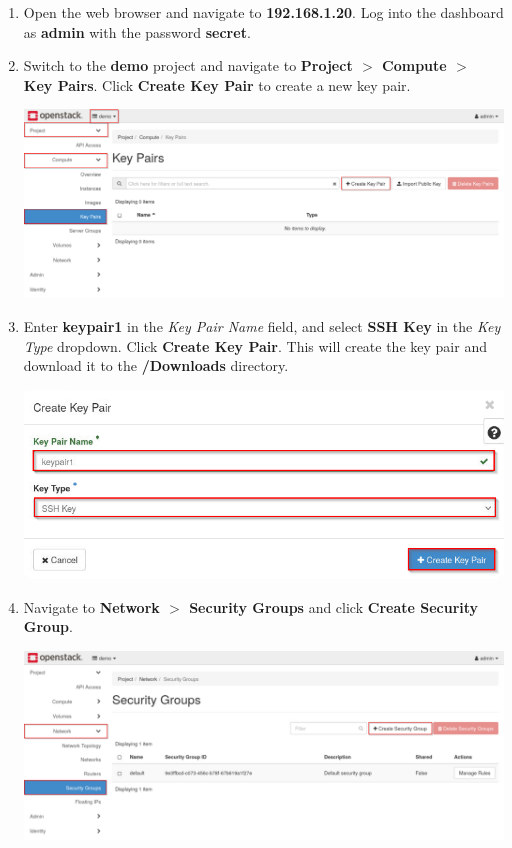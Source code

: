 \documentclass[letterpaper, 12pt]{article}
\begin{document}
\begin{enumerate}
    \item Open the web browser and navigate to \textbf{192.168.1.20}. Log into the dashboard as \textbf{admin} with the
    password \textbf{secret}.

    \item Switch to the \textbf{demo} project and navigate to \textbf{Project $>$ Compute $>$ Key Pairs}. Click
    \textbf{Create Key Pair} to create a new key pair.

    \begin{center}
        \includegraphics[width=\linewidth]{images/part4/step2.png}
    \end{center}

    \item Enter \textbf{keypair1} in the \textit{Key Pair Name} field, and select \textbf{SSH Key} in the \textit{Key
    Type} dropdown. Click \textbf{Create Key Pair}. This will create the key pair and download it to the
    \textbf{\texttildemid/Downloads} directory.

    \begin{center}
        \includegraphics[width=\linewidth]{images/part4/step3.png}
    \end{center}

    \item Navigate to \textbf{Network $>$ Security Groups} and click \textbf{Create Security Group}.

    \begin{center}
        \includegraphics[width=\linewidth]{images/part4/step4.png}
    \end{center}


\end{enumerate}
\end{document}
